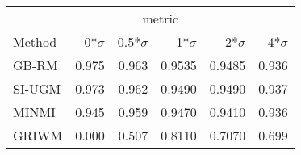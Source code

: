 
\begin{tabular}{lrrrrr}
\toprule
\multicolumn{1}{c}{ } & \multicolumn{4}{c}{metric} \\
\cmidrule(l{3pt}r{3pt}){2-5}
Method & 0*$\sigma$ & 0.5*$\sigma$ & 1*$\sigma$ & 2*$\sigma$ & 4*$\sigma$\\
\midrule
GB-RM & 0.975 & 0.963 & 0.9535 & 0.9485 & 0.936\\
SI-UGM & 0.973 & 0.962 & 0.9490 & 0.9490 & 0.937\\
MINMI & 0.945 & 0.959 & 0.9470 & 0.9410 & 0.936\\
GRIWM & 0.000 & 0.507 & 0.8110 & 0.7070 & 0.699\\
\bottomrule
\end{tabular}
